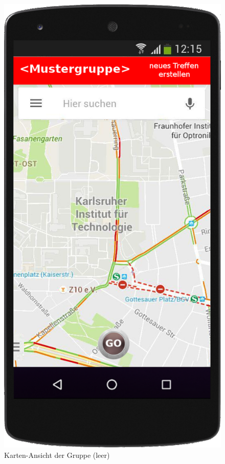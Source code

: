 \begin{figure}
	\includegraphics[scale=0.2]{resources/images/handy/map_leer_admin.png}
	\caption{Karten-Ansicht der Gruppe (leer)}
\end{figure}

